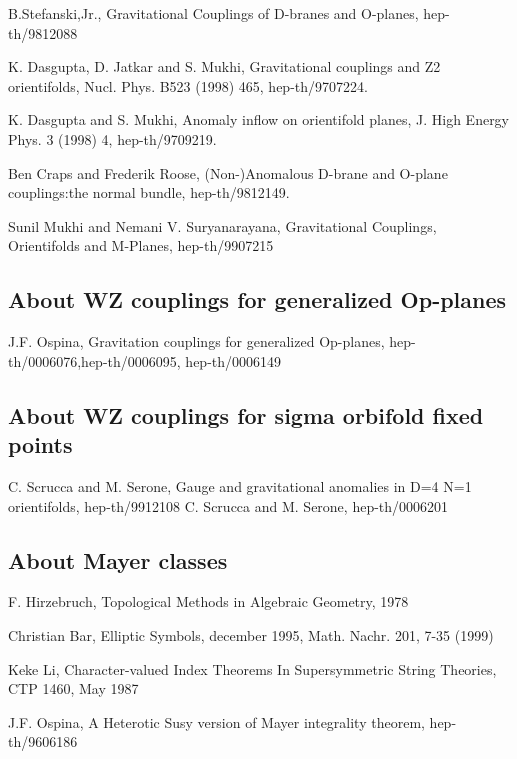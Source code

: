 \documentclass[a4paper,a4paper]{article}
\begin{document}
B.Stefanski,Jr., Gravitational Couplings of D-branes and O-planes, hep-th/9812088

K. Dasgupta, D. Jatkar and S. Mukhi, Gravitational couplings and Z2 orientifolds, Nucl. Phys. B523 (1998) 465, hep-th/9707224.

K. Dasgupta and S. Mukhi, Anomaly inflow on orientifold planes, J. High Energy Phys. 3 (1998) 4, hep-th/9709219.

Ben Craps and Frederik Roose, (Non-)Anomalous D-brane and O-plane couplings:the normal bundle,  hep-th/9812149.

Sunil Mukhi and Nemani V. Suryanarayana,  Gravitational Couplings, Orientifolds and M-Planes,  hep-th/9907215

\subsection{About WZ couplings  for generalized Op-planes}
\setlength{\baselineskip}{20pt}

J.F. Ospina, Gravitation couplings for generalized Op-planes, hep-th/0006076,hep-th/0006095, hep-th/0006149

\subsection{About WZ couplings  for sigma orbifold fixed points}
\setlength{\baselineskip}{20pt}
C. Scrucca and M. Serone, Gauge and gravitational anomalies in D=4 N=1 orientifolds, hep-th/9912108
C. Scrucca and M. Serone, hep-th/0006201

\subsection{About Mayer classes}
\setlength{\baselineskip}{20pt}

F. Hirzebruch, Topological Methods in Algebraic Geometry, 1978

Christian Bar,  Elliptic Symbols, december 1995, Math. Nachr. 201, 7-35 (1999)

Keke Li,  Character-valued Index Theorems In Supersymmetric String Theories,
CTP  1460, May 1987

J.F. Ospina, A Heterotic Susy version of  Mayer integrality theorem, hep-th/9606186
   
\end{document}
